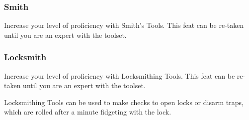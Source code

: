 \subsubsection{Smith} \label{feat::smith}
    Increase your level of proficiency with Smith's Tools.
    This feat can be re-taken until you are an expert with the toolset.

\subsubsection{Locksmith} \label{feat::locksmith}
    Increase your level of proficiency with Locksmithing Tools.
    This feat can be re-taken until you are an expert with the toolset.

    Locksmithing Tools can be used to make checks to open locks or disarm traps, which are rolled after a minute fidgeting with the lock.
